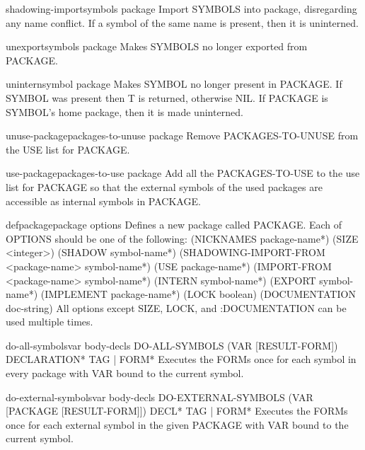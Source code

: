 \documentclass[10pt,english]{book}
\begin{document}
\begin{function}{shadowing-import}{symbols \op package}
  Import SYMBOLS into package, disregarding any name conflict. If
  a symbol of the same name is present, then it is uninterned.
\end{function}

\begin{function}{unexport}{symbols \op package}
  Makes SYMBOLS no longer exported from PACKAGE.
\end{function}

\begin{function}{unintern}{symbol \op package}
  Makes SYMBOL no longer present in PACKAGE. If SYMBOL was present then T is
returned, otherwise NIL. If PACKAGE is SYMBOL's home package, then it is made
uninterned.
\end{function}

\begin{function}{unuse-package}{packages-to-unuse \op package}
  Remove PACKAGES-TO-UNUSE from the USE list for PACKAGE.
\end{function}

\begin{function}{use-package}{packages-to-use \op package}
  Add all the PACKAGES-TO-USE to the use list for PACKAGE so that the
external symbols of the used packages are accessible as internal symbols in
PACKAGE.
\end{function}

\begin{macro}{defpackage}{package \rest options}
  Defines a new package called PACKAGE. Each of OPTIONS should be one of the
   following: 
    (NICKNAMES {package-name}*)
    (SIZE <integer>)
    (SHADOW {symbol-name}*)
    (SHADOWING-IMPORT-FROM <package-name> {symbol-name}*)
    (USE {package-name}*)
    (IMPORT-FROM <package-name> {symbol-name}*)
    (INTERN {symbol-name}*)
    (EXPORT {symbol-name}*)
    (IMPLEMENT {package-name}*)
    (LOCK boolean)
    (DOCUMENTATION doc-string)
   All options except SIZE, LOCK, and :DOCUMENTATION can be used multiple
   times.
\end{macro}

\begin{macro}{do-all-symbols}{var \body body-decls}
  DO-ALL-SYMBOLS (VAR [RESULT-FORM]) {DECLARATION}* {TAG | FORM}*
   Executes the FORMs once for each symbol in every package with VAR bound
   to the current symbol.
\end{macro}

\begin{macro}{do-external-symbols}{var \body body-decls}
  DO-EXTERNAL-SYMBOLS (VAR [PACKAGE [RESULT-FORM]]) {DECL}* {TAG | FORM}*
   Executes the FORMs once for each external symbol in the given PACKAGE with
   VAR bound to the current symbol.
\end{macro}
\end{document}
